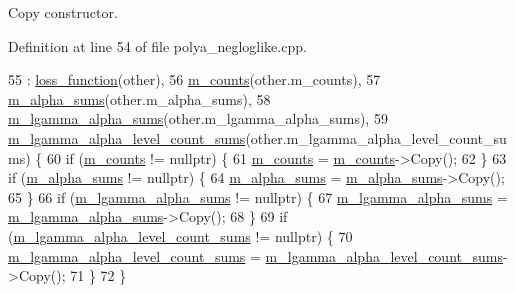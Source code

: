 Copy constructor. 

Definition at line 54 of file polya\+\_\+negloglike.\+cpp.


\begin{DoxyCode}
55   : \hyperlink{classlbann_1_1loss__function_a0c5745e661c59e3e5496888d233c07cf}{loss\_function}(other),
56     \hyperlink{classlbann_1_1polya__negloglike_a441387814cd7deafb1f70c91926d3004}{m\_counts}(other.m\_counts),
57     \hyperlink{classlbann_1_1polya__negloglike_aa77620f256de700ae8b3ca921957bcd1}{m\_alpha\_sums}(other.m\_alpha\_sums),
58     \hyperlink{classlbann_1_1polya__negloglike_a0aec768ffa50a8b716149d597699eddb}{m\_lgamma\_alpha\_sums}(other.m\_lgamma\_alpha\_sums),
59     \hyperlink{classlbann_1_1polya__negloglike_a78c9da1fb83c7b79a12cfbf30a4cb59e}{m\_lgamma\_alpha\_level\_count\_sums}(other.m\_lgamma\_alpha\_level\_count\_sums) \{
60   \textcolor{keywordflow}{if} (\hyperlink{classlbann_1_1polya__negloglike_a441387814cd7deafb1f70c91926d3004}{m\_counts} != \textcolor{keyword}{nullptr}) \{
61     \hyperlink{classlbann_1_1polya__negloglike_a441387814cd7deafb1f70c91926d3004}{m\_counts} = \hyperlink{classlbann_1_1polya__negloglike_a441387814cd7deafb1f70c91926d3004}{m\_counts}->Copy();
62   \}
63   \textcolor{keywordflow}{if} (\hyperlink{classlbann_1_1polya__negloglike_aa77620f256de700ae8b3ca921957bcd1}{m\_alpha\_sums} != \textcolor{keyword}{nullptr}) \{
64     \hyperlink{classlbann_1_1polya__negloglike_aa77620f256de700ae8b3ca921957bcd1}{m\_alpha\_sums} = \hyperlink{classlbann_1_1polya__negloglike_aa77620f256de700ae8b3ca921957bcd1}{m\_alpha\_sums}->Copy();
65   \}
66   \textcolor{keywordflow}{if} (\hyperlink{classlbann_1_1polya__negloglike_a0aec768ffa50a8b716149d597699eddb}{m\_lgamma\_alpha\_sums} != \textcolor{keyword}{nullptr}) \{
67     \hyperlink{classlbann_1_1polya__negloglike_a0aec768ffa50a8b716149d597699eddb}{m\_lgamma\_alpha\_sums} = \hyperlink{classlbann_1_1polya__negloglike_a0aec768ffa50a8b716149d597699eddb}{m\_lgamma\_alpha\_sums}->Copy();
68   \}
69   \textcolor{keywordflow}{if} (\hyperlink{classlbann_1_1polya__negloglike_a78c9da1fb83c7b79a12cfbf30a4cb59e}{m\_lgamma\_alpha\_level\_count\_sums} != \textcolor{keyword}{nullptr}) \{
70     \hyperlink{classlbann_1_1polya__negloglike_a78c9da1fb83c7b79a12cfbf30a4cb59e}{m\_lgamma\_alpha\_level\_count\_sums} = 
      \hyperlink{classlbann_1_1polya__negloglike_a78c9da1fb83c7b79a12cfbf30a4cb59e}{m\_lgamma\_alpha\_level\_count\_sums}->Copy();
71   \}
72 \}
\end{DoxyCode}
\mbox{\label{classlbann_1_1polya__negloglike_a0c00f1f9cac0b0c6a638b86e031768e3}} 
